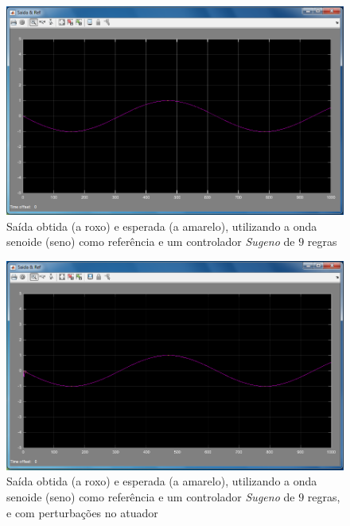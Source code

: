 \documentclass{article}
\begin{document}
\begin{figure}[h]
  \centering
      \includegraphics[scale=0.3]{Images/Sugeno_9_sin.png}
  \caption{Saída obtida (a roxo) e esperada (a amarelo), utilizando a onda senoide (seno) como referência e um controlador \emph{Sugeno} de $9$ regras}
\end{figure}

\begin{figure}[h]
  \centering
      \includegraphics[scale=0.3]{Images/Sugeno_9_sin_actuator.png}
  \caption{Saída obtida (a roxo) e esperada (a amarelo), utilizando a onda senoide (seno) como referência e um controlador \emph{Sugeno} de $9$ regras, e com perturbações no atuador}
\end{figure}
\end{document}
